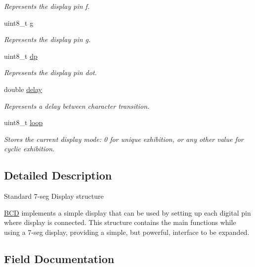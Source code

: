 \begin{DoxyCompactItemize}
\begin{DoxyCompactList}\small\item\em Represents the display pin \textquotesingle{}f\textquotesingle{}. \end{DoxyCompactList}\item 
uint8\+\_\+t \mbox{\hyperlink{structBCD_a84dac73393cccf960f31340c034aee2e}{g}}
\begin{DoxyCompactList}\small\item\em Represents the display pin \textquotesingle{}g\textquotesingle{}. \end{DoxyCompactList}\item 
uint8\+\_\+t \mbox{\hyperlink{structBCD_a2a88e8f3a8147a01b12e3393b4b034c2}{dp}}
\begin{DoxyCompactList}\small\item\em Represents the display pin \textquotesingle{}dot\textquotesingle{}. \end{DoxyCompactList}\item 
double \mbox{\hyperlink{structBCD_a4575c9325254534125fadd7d32061f57}{delay}}
\begin{DoxyCompactList}\small\item\em Represents a delay between character transition. \end{DoxyCompactList}\item 
uint8\+\_\+t \mbox{\hyperlink{structBCD_a6daf4f1f982e97a20852eedd79f4d619}{loop}}
\begin{DoxyCompactList}\small\item\em Stores the current display mode\+: 0 for unique exhibition, or any other value for cyclic exhibition. \end{DoxyCompactList}\end{DoxyCompactItemize}


\subsection{Detailed Description}
Standard 7-\/seg Display structure

\mbox{\hyperlink{structBCD}{B\+CD}} implements a simple display that can be used by setting up each digital pin where display is connected. This structure contains the main functions while using a 7-\/seg display, providing a simple, but powerful, interface to be expanded. 

\subsection{Field Documentation}
\mbox{\label{structBCD_a47f4ac66f533a80b7ad832c36189eef9}} 
